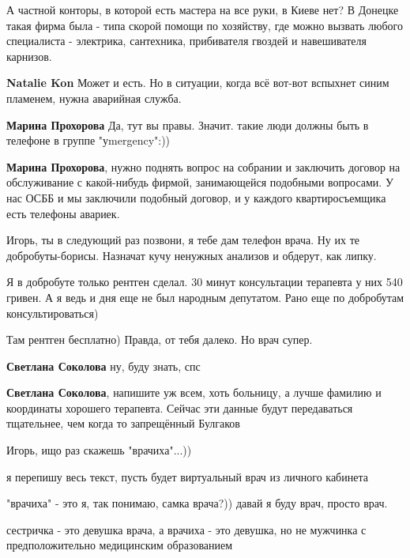 \begin{itemize}
\begin{itemize}

А частной конторы, в которой есть мастера на все руки, в Киеве нет? В Донецке
такая фирма была - типа скорой помощи по хозяйству, где можно вызвать любого
специалиста - электрика, сантехника, прибивателя гвоздей и навешивателя
карнизов.

\textbf{Natalie Kon} Может и есть. Но в ситуации, когда всё вот-вот вспыхнет синим пламенем, нужна аварийная служба.

\textbf{Марина Прохорова} Да, тут вы правы. Значит. такие люди должны быть в телефоне в группе "уmergency":))

\textbf{Марина Прохорова}, нужно поднять вопрос на собрании и заключить договор на обслуживание с какой-нибудь фирмой, занимающейся подобными вопросами. У нас ОСББ и мы заключили подобный договор, и у каждого квартиросъемщика есть телефоны авариек.
\end{itemize} %


Игорь, ты в следующий раз позвони, я тебе дам телефон врача. Ну их те
добробуты-борисы. Назначат кучу ненужных анализов и обдерут, как липку.

\begin{itemize} %
Я в добробуте только рентген сделал. 30 минут консультации терапевта у них 540 гривен. А я ведь и дня еще не был народным депутатом. Рано еще по добробутам консультироваться)

Там рентген бесплатно) Правда, от тебя далеко. Но врач супер.

\textbf{Светлана Соколова} ну, буду знать, спс

\textbf{Светлана Соколова}, напишите уж всем, хоть больницу, а лучше фамилию и координаты хорошего терапевта. Сейчас эти данные будут передаваться тщательнее, чем когда то запрещённый Булгаков
\end{itemize} %

Игорь, ищо раз скажешь "врачиха"...))

\begin{itemize} %
я перепишу весь текст, пусть будет виртуальный врач из личного кабинета

"врачиха" - это я, так понимаю, самка врача?)) давай я буду врач, просто врач.

сестричка - это девушка врача, а врачиха - это девушка, но не мужчинка с предположительно медицинским образованием


\end{itemize}
\end{itemize}
